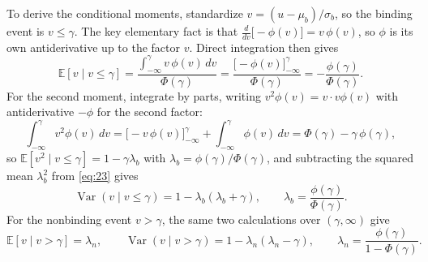 \documentclass[11pt]{article}
\begin{document}
To derive the conditional moments, standardize $v=(u-\mu_b)/\sigma_b$, so the
binding event is $v\leq\gamma$. The key elementary fact is that
$\frac{d}{dv}\bigl[-\phi(v)\bigr]=v\,\phi(v)$, so $\phi$ is its own
antiderivative up to the factor $v$. Direct integration then gives
\begin{equation}\label{eq:23}
 \mathbb E[v\mid v\leq\gamma]
 =\frac{\int_{-\infty}^{\gamma}v\,\phi(v)\,dv}{\Phi(\gamma)}
 =\frac{\bigl[-\phi(v)\bigr]_{-\infty}^{\gamma}}{\Phi(\gamma)}
 =-\frac{\phi(\gamma)}{\Phi(\gamma)}.
\end{equation}
For the second moment, integrate by parts, writing
$v^2\phi(v)=v\cdot v\phi(v)$ with antiderivative $-\phi$ for the second
factor:
\[
 \int_{-\infty}^{\gamma}v^2\phi(v)\,dv
 =\bigl[-v\,\phi(v)\bigr]_{-\infty}^{\gamma}
  +\int_{-\infty}^{\gamma}\phi(v)\,dv
 =\Phi(\gamma)-\gamma\,\phi(\gamma),
\]
so $\mathbb E[v^2\mid v\leq\gamma]=1-\gamma\lambda_b$ with
$\lambda_b=\phi(\gamma)/\Phi(\gamma)$, and subtracting the squared mean
$\lambda_b^2$ from \eqref{eq:23} gives
\begin{equation}\label{eq:24}
 \operatorname{Var}(v\mid v\leq\gamma)
 =1-\lambda_b(\lambda_b+\gamma),
 \qquad
 \lambda_b=\frac{\phi(\gamma)}{\Phi(\gamma)}.
\end{equation}
For the nonbinding event $v>\gamma$, the same two calculations over
$(\gamma,\infty)$ give
\begin{equation}\label{eq:25}
 \mathbb E[v\mid v>\gamma]=\lambda_n,
 \qquad
 \operatorname{Var}(v\mid v>\gamma)
 =1-\lambda_n(\lambda_n-\gamma),
 \qquad
 \lambda_n=\frac{\phi(\gamma)}{1-\Phi(\gamma)}.
\end{equation}
\end{document}
